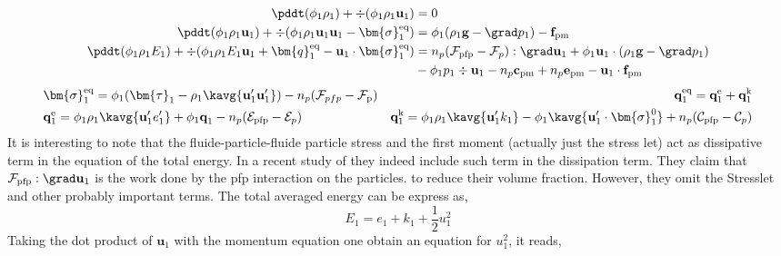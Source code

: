 \begin{align}
    \pddt (\phi_1 \rho_1)  
    + \div (
        \phi_1 \rho_1\textbf{u}_1
    )
    &= 
    0\\
    \pddt (\phi_1 \rho_1\textbf{u}_1)  
    + \div (
        \phi_1 \rho_1\textbf{u}_1\textbf{u}_1
        - \bm{\sigma}_1^\text{eq}
    )
    &= 
    \phi_1  (\rho_1\textbf{g} - \grad p_1 )
    -  \textbf{f}_\text{pm}\\
    \pddt (\phi_1\rho_1E_1)  
    + \div (
        \phi_1\rho_1E_1\textbf{u}_1
        + \bm{q}_1^\text{eq}
        - \textbf{u}_1 \cdot \bm{\sigma}_1^\text{eq}
        )
    &= 
    n_p (\mathcal{F}_\text{pfp} - \mathcal{F}_p):\grad \textbf{u}_1
    + \phi_1 \textbf{u}_1 \cdot (\rho_1\textbf{g}
    - \grad p_1 
    )\nonumber \\ 
    &- \phi_1 p_1 \div \textbf{u}_1
    - n_p \textbf{c}_\text{pm}
    + n_p \textbf{e}_\text{pm}
    - \textbf{u}_1 \cdot \textbf{f}_\text{pm}
\end{align} 
\begin{align*}
    &\bm{\sigma}_1^\text{eq}
    = \phi_1 (
        \bm{\tau}_1%
        - \rho_1\kavg{\textbf{u}_1'\textbf{u}_1'}) 
        - n_p  (\mathcal{F}_{pfp} - \mathcal{F}_\text{p})
    &\textbf{q}_1^\text{eq}
    =\textbf{q}_1^\text{e} 
    +\textbf{q}_1^\text{k}  \\
    &\textbf{q}_1^\text{e}
    = \phi_1\rho_1 \kavg{\textbf{u}_1' e_1'} 
    + \phi_1\textbf{q}_1 
    - n_p (\mathcal{E}_\text{pfp} - \mathcal{E}_p)
    &\textbf{q}_1^\text{k}
    = \phi_1\rho_1 \kavg{\textbf{u}_1' k_1} 
    - \phi_1\kavg{\textbf{u}_1' \cdot \bm{\sigma}_1^0}
    + n_p (\mathcal{C}_\text{pfp} - \mathcal{C}_p)
\end{align*}
It is interesting to note that the fluide-particle-fluide particle stress and the first moment (actually just the stress let) act as dissipative term in the equation of the total energy. 
In a recent study of \citet{boniou2023shock} they indeed include such term in the dissipation term. 
They claim that $\mathcal{F}_\text{pfp} : \grad \textbf{u}_1 $ is the work done by the pfp interaction on the particles.
to reduce their volume fraction. 
However, they omit the Stresslet and other probably important terms. 
The total averaged energy can be express as, 
\begin{equation*}
    E_1 = e_1 + k_1 + \frac{1}{2}u^2_1 
\end{equation*}
Taking the dot product of $\textbf{u}_1$ with the momentum equation one obtain an equation for $u^2_1$, it reads, 
